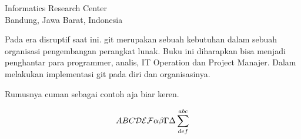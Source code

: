 

{Informatics Research Center\\
Bandung, Jawa Barat, Indonesia}

Pada era disruptif   
saat ini. git merupakan sebuah kebutuhan dalam sebuah organisasi pengembangan perangkat lunak.
Buku ini diharapkan bisa menjadi penghantar para programmer, analis, IT Operation dan Project Manajer.
Dalam melakukan implementasi git pada diri dan organisasinya.

Rumusnya cuman sebagai contoh aja biar keren.

\begin{equation}
ABC {\cal DEF} \alpha\beta\Gamma\Delta\sum^{abc}_{def}
\end{equation}
